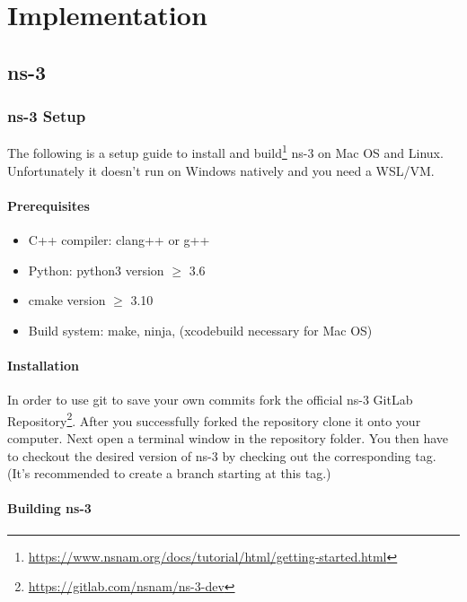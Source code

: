 
\chapter{Implementation}
\label{chapter:implementation}
\section{ns-3}

\subsection{ns-3 Setup}

The following is a setup guide to install and build\footnote[1]{\url{https://www.nsnam.org/docs/tutorial/html/getting-started.html}} ns-3 on Mac OS and Linux. Unfortunately it doesn't run on Windows natively and you need a WSL/VM.

\subsubsection{Prerequisites}
\begin{itemize}
    \item C++ compiler: clang++ or g++
    \item Python: python3 version $\geq$ 3.6
    \item cmake version $\geq$ 3.10
    \item Build system: make, ninja, (xcodebuild necessary for Mac OS)
\end{itemize}

\subsubsection{Installation}

In order to use git to save your own commits fork the official ns-3 GitLab Repository\footnote[2]{\url{https://gitlab.com/nsnam/ns-3-dev}}. After you successfully forked the repository clone it onto your computer. Next open a terminal window in the repository folder. You then have to checkout the desired version of ns-3 by checking out the corresponding tag. (It's recommended to create a branch starting at this tag.) 

\subsubsection{Building ns-3}

